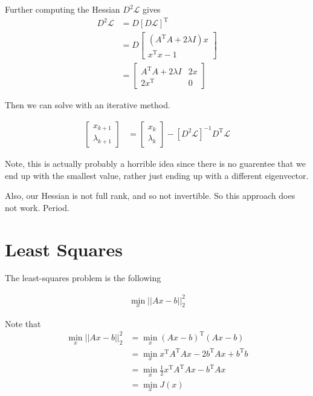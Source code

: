\documentclass{article}
\begin{document}
Further computing the Hessian $D^2 \mathcal{L}$ gives
\begin{align*}
    D^2 \mathcal{L} &= D \left[ D \mathcal{L} \right]^\mathrm{T} \\
    &= D \begin{bmatrix}
        \left( A^\mathrm{T} A + 2 \lambda I \right) x \\
        x^\mathrm{T} x - 1
    \end{bmatrix} \\
    &= \begin{bmatrix}
        A^\mathrm{T} A + 2 \lambda I & 2 x \\
        2 x^\mathrm{T} & 0
    \end{bmatrix}
\end{align*}

Then we can solve with an iterative method.

\begin{align*}
    \begin{bmatrix}
        x_{k+1} \\
        \lambda_{k+1}
    \end{bmatrix} &= \begin{bmatrix}
        x_k \\
        \lambda_k
    \end{bmatrix} - \left[D^2 \mathcal{L}\right]^{-1} D^\mathrm{T} \mathcal{L}
\end{align*}

Note, this is actually probably a horrible idea since there is no guarentee that we end up with the smallest value, rather just ending up with a different eigenvector.

Also, our Hessian is not full rank, and so not invertible. So this approach does not work. Period.

\section{Least Squares}

The least-squares problem is the following

\begin{align*}
    \min_x || A x - b ||_2^2
\end{align*}

Note that 
\begin{align*}
    \min_x || A x - b ||_2^2 &= \min_x (A x - b)^\mathrm{T} (A x - b) \\
    &= \min_x x^\mathrm{T} A^\mathrm{T} A x - 2b^\mathrm{T} A x + b^\mathrm{T} b \\
    &= \min_x \frac{1}{2} x^\mathrm{T} A^\mathrm{T} A x - b^\mathrm{T} A x \\
    &= \min_x J(x)
\end{align*}
\end{document}
